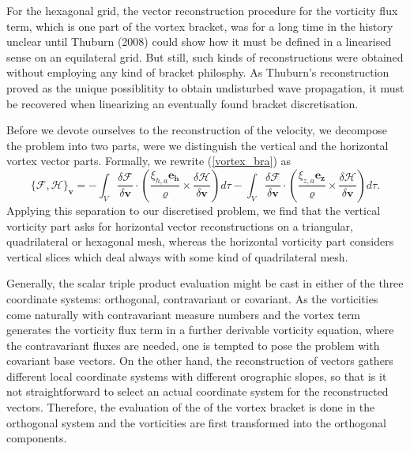 For the hexagonal grid, the vector reconstruction procedure for the vorticity
flux term, which is one part of the vortex bracket, was for a long time in the 
history unclear until Thuburn (2008) could show how it must be defined in a 
linearised sense on an equilateral grid. But still, such kinds of 
reconstructions were obtained without employing any kind of bracket philosphy. 
As Thuburn's reconstruction proved as the unique possiblitity to obtain 
undisturbed wave propagation, it must be recovered when linearizing an 
eventually found bracket discretisation.

Before we devote ourselves to the reconstruction of the velocity, we
decompose the problem into two parts, were we distinguish the vertical and the
horizontal vortex vector parts. Formally, we rewrite (\ref{vortex_bra}) as
\begin{equation}
\{\mathcal{F},\mathcal{H}\}_{\mathbf{v}}=
-\int_V\frac{\delta\mathcal{F}}{\delta\mathbf{v}}\cdot
\left(\frac{\xi_{h,a}\mathbf{e_h}}{\varrho}\times
\frac{\delta\mathcal{H}}{\delta\mathbf{v}}\right)d\tau
-\int_V\frac{\delta\mathcal{F}}{\delta\mathbf{v}}\cdot
\left(\frac{\xi_{z,a}\mathbf{e_z}}{\varrho}\times
\frac{\delta\mathcal{H}}{\delta\mathbf{v}}\right)d\tau.
\label{sep_vortex_bra}
\end{equation}
Applying this separation to our discretised problem, we find that the vertical vorticity part asks for horizontal vector reconstructions on a
triangular, quadrilateral or hexagonal mesh, whereas the horizontal vorticity
part considers vertical slices which deal always with some kind of quadrilateral mesh.

Generally, the scalar triple product evaluation might be cast in either of the three coordinate systems: orthogonal, contravariant or covariant. As the vorticities come naturally with contravariant measure numbers and the vortex term generates the vorticity
flux term in a further derivable vorticity equation, where the contravariant fluxes
are needed, one is tempted to pose the problem with covariant base vectors. On the other
hand, the reconstruction of vectors gathers different local coordinate systems with different orographic slopes, so that is it not straightforward to select an actual coordinate system for the reconstructed vectors. Therefore, the evaluation of the of the
vortex bracket is done in the orthogonal system and the vorticities are first transformed
into the orthogonal components.


